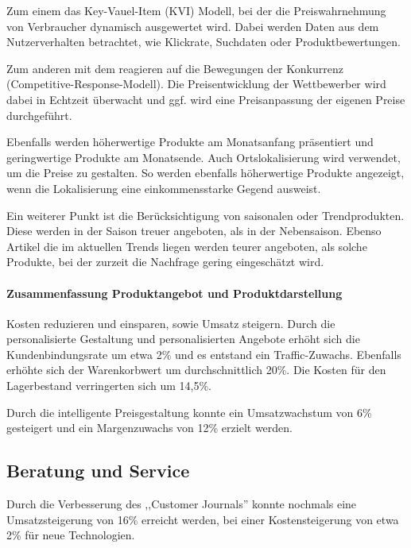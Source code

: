 Zum einem das Key-Vauel-Item (KVI) Modell, bei der die Preiswahrnehmung von Verbraucher dynamisch ausgewertet wird. Dabei werden Daten aus dem Nutzerverhalten betrachtet, wie Klickrate, Suchdaten oder Produktbewertungen.\vspace{0.2cm}

Zum anderen mit dem reagieren auf die Bewegungen der Konkurrenz (Competitive-Response-Modell). Die Preisentwicklung der Wettbewerber wird dabei in Echtzeit überwacht und ggf. wird eine Preisanpassung der eigenen Preise durchgeführt.\vspace{0.2cm}

Ebenfalls werden höherwertige Produkte am Monatsanfang präsentiert und geringwertige Produkte am Monatsende. Auch Ortslokalisierung wird verwendet, um die Preise zu gestalten. So werden ebenfalls höherwertige Produkte angezeigt, wenn die Lokalisierung eine einkommensstarke Gegend ausweist.\vspace{0.2cm}

Ein weiterer Punkt ist die Berücksichtigung von saisonalen oder Trendprodukten. Diese werden in der Saison treuer angeboten, als in der Nebensaison. Ebenso Artikel die im aktuellen Trends liegen werden teurer angeboten, als solche Produkte, bei der zurzeit die Nachfrage gering eingeschätzt wird.

\paragraph{Zusammenfassung Produktangebot und Produktdarstellung} Kosten reduzieren und einsparen, sowie Umsatz steigern. Durch die personalisierte Gestaltung und personalisierten Angebote erhöht sich die Kundenbindungsrate um etwa 2\% und es entstand ein Traffic-Zuwachs. Ebenfalls erhöhte sich der Warenkorbwert um durchschnittlich 20\%. Die Kosten für den Lagerbestand verringerten sich um 14,5\%.\vspace{0.2cm}

Durch die intelligente Preisgestaltung konnte ein Umsatzwachstum von 6\% gesteigert und ein Margenzuwachs von 12\% erzielt werden.

\subsection{Beratung und Service}

Durch die Verbesserung des ,,Customer Journals'' konnte nochmals eine Umsatzsteigerung von 16\% erreicht werden, bei einer Kostensteigerung von etwa 2\% für neue Technologien.

